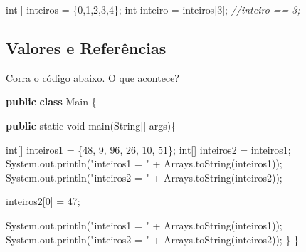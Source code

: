 \documentclass[
]{book}
\newenvironment{Shaded}{\begin{snugshade}}{\end{snugshade}}
\newcommand{\BuiltInTok}[1]{#1}
\newcommand{\CommentTok}[1]{\textcolor[rgb]{0.56,0.35,0.01}{\textit{#1}}}
\newcommand{\DataTypeTok}[1]{\textcolor[rgb]{0.13,0.29,0.53}{#1}}
\newcommand{\DecValTok}[1]{\textcolor[rgb]{0.00,0.00,0.81}{#1}}
\newcommand{\FunctionTok}[1]{\textcolor[rgb]{0.00,0.00,0.00}{#1}}
\newcommand{\KeywordTok}[1]{\textcolor[rgb]{0.13,0.29,0.53}{\textbf{#1}}}
\newcommand{\NormalTok}[1]{#1}
\newcommand{\StringTok}[1]{\textcolor[rgb]{0.31,0.60,0.02}{#1}}
\begin{document}
\begin{Shaded}
\begin{Highlighting}[]
\DataTypeTok{int}\NormalTok{[] inteiros = \{}\DecValTok{0}\NormalTok{,}\DecValTok{1}\NormalTok{,}\DecValTok{2}\NormalTok{,}\DecValTok{3}\NormalTok{,}\DecValTok{4}\NormalTok{\};}
\DataTypeTok{int}\NormalTok{ inteiro = inteiros[}\DecValTok{3}\NormalTok{];}
\CommentTok{//inteiro == 3;}
\end{Highlighting}
\end{Shaded}

\hypertarget{valores-e-referuxeancias}{%
\subsection{Valores e Referências}\label{valores-e-referuxeancias}}

Corra o código abaixo. O que acontece?

\begin{Shaded}
\begin{Highlighting}[]
\KeywordTok{public} \KeywordTok{class}\NormalTok{ Main \{}

    \KeywordTok{public} \DataTypeTok{static} \DataTypeTok{void} \FunctionTok{main}\NormalTok{(}\BuiltInTok{String}\NormalTok{[] args)\{}

        \DataTypeTok{int}\NormalTok{[] inteiros1 = \{}\DecValTok{48}\NormalTok{, }\DecValTok{9}\NormalTok{, }\DecValTok{96}\NormalTok{, }\DecValTok{26}\NormalTok{, }\DecValTok{10}\NormalTok{, }\DecValTok{51}\NormalTok{\};}
        \DataTypeTok{int}\NormalTok{[] inteiros2 = inteiros1;}
        \BuiltInTok{System}\NormalTok{.}\FunctionTok{out}\NormalTok{.}\FunctionTok{println}\NormalTok{(}\StringTok{"inteiros1 =  "}\NormalTok{ + }\BuiltInTok{Arrays}\NormalTok{.}\FunctionTok{toString}\NormalTok{(inteiros1));}
        \BuiltInTok{System}\NormalTok{.}\FunctionTok{out}\NormalTok{.}\FunctionTok{println}\NormalTok{(}\StringTok{"inteiros2 =  "}\NormalTok{ + }\BuiltInTok{Arrays}\NormalTok{.}\FunctionTok{toString}\NormalTok{(inteiros2));}

\NormalTok{        inteiros2[}\DecValTok{0}\NormalTok{] = }\DecValTok{47}\NormalTok{;}

        \BuiltInTok{System}\NormalTok{.}\FunctionTok{out}\NormalTok{.}\FunctionTok{println}\NormalTok{(}\StringTok{"inteiros1 =  "}\NormalTok{ + }\BuiltInTok{Arrays}\NormalTok{.}\FunctionTok{toString}\NormalTok{(inteiros1));}
        \BuiltInTok{System}\NormalTok{.}\FunctionTok{out}\NormalTok{.}\FunctionTok{println}\NormalTok{(}\StringTok{"inteiros2 =  "}\NormalTok{ + }\BuiltInTok{Arrays}\NormalTok{.}\FunctionTok{toString}\NormalTok{(inteiros2));}
\NormalTok{    \}}
\NormalTok{\}}
\end{Highlighting}
\end{Shaded}
\end{document}
